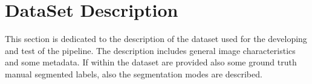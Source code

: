 \documentclass{standalone}
\begin{document}
	\section{DataSet Description}
	
	This section is dedicated to the description of the dataset used for the developing and test of the pipeline. The description includes general image characteristics and some metadata. If within the dataset are provided also some ground truth manual segmented labels, also the segmentation modes are described. 
\end{document}

